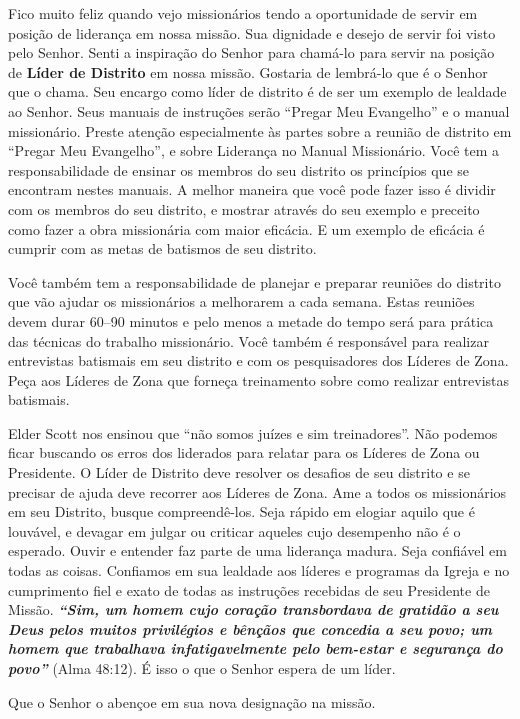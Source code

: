 Fico muito feliz quando vejo mission\'arios tendo a oportunidade de servir em posi\c c\~ao de lideran\c ca em nossa miss\~ao. Sua dignidade e desejo de servir foi visto pelo Senhor. Senti a inspira\c c\~ao do Senhor para cham\'a-lo para servir na posi\c c\~ao de \textbf{L\'ider de Distrito} em nossa miss\~ao. Gostaria de lembr\'a-lo que \'e o Senhor que o chama. Seu encargo como l\'ider de distrito \'e de ser um exemplo de lealdade ao Senhor. Seus manuais de instru\c c\~oes ser\~ao ``Pregar Meu Evangelho'' e o manual mission\'ario. Preste aten\c c\~ao especialmente \`as partes sobre a reuni\~ao de distrito em ``Pregar Meu Evangelho'', e sobre Lideran\c ca no Manual Mission\'ario. Voc\^e tem a responsabilidade de ensinar os membros do seu distrito os princ\'ipios que se encontram nestes manuais. A melhor maneira que voc\^e pode fazer isso \'e dividir com os membros do seu distrito, e mostrar atrav\'es do seu exemplo e preceito como fazer a obra mission\'aria com maior efic\'acia. E um exemplo de efic\'acia \'e cumprir com as metas de batismos de seu distrito.

Voc\^e tamb\'em tem a responsabilidade de planejar e preparar reuni\~oes do distrito que v\~ao ajudar os mission\'arios a melhorarem a cada semana. Estas reuni\~oes devem durar 60--90 minutos e pelo menos a metade do tempo ser\'a para pr\'atica das t\'ecnicas do trabalho mission\'ario. Voc\^e tamb\'em \'e respons\'avel para realizar entrevistas batismais em seu distrito e com os pesquisadores dos L\'ideres de Zona. Pe\c ca aos L\'ideres de Zona que forne\c ca treinamento sobre como realizar entrevistas batismais.

Elder Scott nos ensinou que ``n\~ao somos ju\'izes e sim treinadores''. N\~ao podemos ficar buscando os erros dos liderados para relatar para os L\'ideres de Zona ou Presidente. O L\'ider de Distrito deve resolver os desafios de seu distrito e se precisar de ajuda deve recorrer aos L\'ideres de Zona. Ame a todos os mission\'arios em seu Distrito, busque compreend\^e-los. Seja r\'apido em elogiar aquilo que \'e louv\'avel, e devagar em julgar ou criticar aqueles cujo desempenho n\~ao \'e o esperado. Ouvir e entender faz parte de uma lideran\c ca madura. Seja confi\'avel em todas as coisas. Confiamos em sua lealdade aos l\'ideres e programas da Igreja e no cumprimento fiel e exato de todas as instru\c c\~oes recebidas de seu Presidente de Miss\~ao. \textbf{\textit{``Sim, um homem cujo cora\c c\~ao transbordava de gratid\~ao a seu Deus pelos muitos privil\'egios e b\^en\c c\~aos que concedia a seu povo; um homem que trabalhava infatigavelmente pelo bem-estar e seguran\c ca do povo''}} (Alma 48:12). \'E isso o que o Senhor espera de um l\'ider.

Que o Senhor o aben\c coe em sua nova designa\c c\~ao na miss\~ao.
